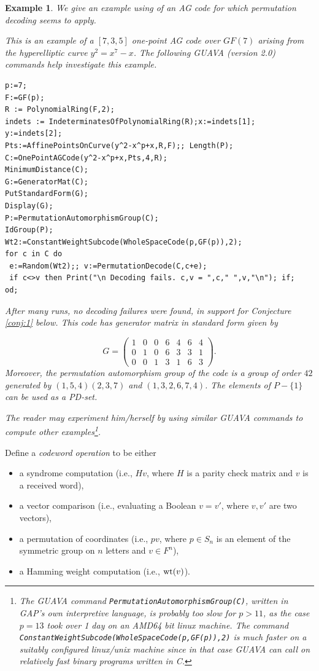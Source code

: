 \documentclass[12pt]{article}
\newtheorem{example}[theorem]{Example}
\numberwithin{equation}{section}
\def\wt{{\rm{wt}}}
\begin{document}
\begin{example}
We give an example using \cite{GUAVA} of an
AG code for which permutation decoding seems to
apply.

This is an example of a $[7,3,5]$ one-point AG
code over $GF(7)$ arising from the hyperelliptic curve
$y^2=x^7-x$. The following GUAVA (version 2.0)
commands help investigate this example.

{\small{
\begin{verbatim}
p:=7;
F:=GF(p);
R := PolynomialRing(F,2);
indets := IndeterminatesOfPolynomialRing(R);x:=indets[1]; y:=indets[2];
Pts:=AffinePointsOnCurve(y^2-x^p+x,R,F);; Length(P);
C:=OnePointAGCode(y^2-x^p+x,Pts,4,R);
MinimumDistance(C);
G:=GeneratorMat(C);
PutStandardForm(G);
Display(G);
P:=PermutationAutomorphismGroup(C); 
IdGroup(P);
Wt2:=ConstantWeightSubcode(WholeSpaceCode(p,GF(p)),2);
for c in C do
 e:=Random(Wt2);; v:=PermutationDecode(C,c+e);
 if c<>v then Print("\n Decoding fails. c,v = ",c," ",v,"\n"); if;
od;
\end{verbatim}
}}
After many runs, no decoding failures were found, 
in support for Conjecture \ref{conj:1} below.
This code has generator matrix in standard form given by

\[
G=
\left(
\begin{array}{ccccccc}
1 &0 &0 &6 &4 &6 &4\\
0 &1 &0 &6 &3 &3 &1\\
0 &0 &1 &3 &1 &6 &3
\end{array}
\right).
\]
Moreover, the permutation automorphism group of the 
code is a group
of order $42$ generated by
$(1,5,4)(2,3,7)$ and $(1,3,2,6,7,4)$.
The elements of $P-\{1\}$ can be used as a PD-set.

The reader may experiment him/herself by using
similar GUAVA commands to compute other 
examples\footnote{The GUAVA command
{\tt PermutationAutomorphismGroup(C)},
written in GAP's own interpretive language, 
is probably too slow for $p>11$, as the case $p=13$ took
over 1 day on an AMD64 bit linux machine. 
The command 
{\tt ConstantWeightSubcode(WholeSpaceCode(p,GF(p)),2)} 
is much faster on a suitably configured 
linux/unix machine since in that case GUAVA can call on
relatively fast binary programs written in C.}.
\end{example}

Define a {\it codeword operation}
to be either 
\begin{itemize}
\item
a syndrome computation
(i.e., $Hv$, where $H$ is a parity check matrix and $v$
is a received word),

\item
a vector comparison
(i.e., evaluating a Boolean $v=v'$, 
where $v,v'$ are two vectors),

\item
a permutation of coordinates (i.e., $pv$, where
$p\in S_n$ is an element of the symmetric group
on $n$ letters and $v\in F^n$),

\item
a Hamming weight computation (i.e., $\wt (v)$).
\end{itemize}
 
\end{document}
